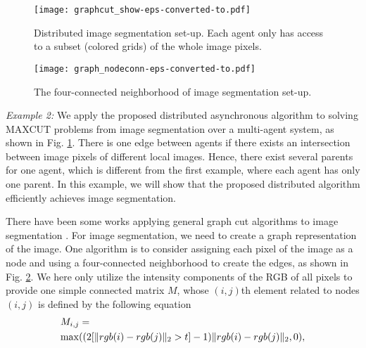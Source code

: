 \documentclass[journal]{IEEEtran}
\newtheorem{remark}{Remark}[section]
\begin{document}
\begin{figure}
	\centering
	\texttt{[image: graphcut\_show-eps-converted-to.pdf]}\\
	\caption{Distributed image segmentation set-up. Each agent only has access to a subset (colored grids) of the whole image pixels.}\label{image_cut_show}
	\centering
\end{figure}
\begin{figure}
	\centering
	\texttt{[image: graph\_nodeconn-eps-converted-to.pdf]}\\
	\caption{The four-connected neighborhood of image segmentation set-up.}\label{pixel_show}
	\centering
\end{figure}
\par \textit{Example 2:} We apply the proposed distributed asynchronous algorithm to solving MAXCUT problems from image segmentation over a multi-agent system, as shown in Fig. \ref{image_cut_show}. There is one edge between agents if there exists an intersection between image pixels of different local images. Hence, there exist several parents for one agent, which is different from the first example, where each agent has only one parent. In this example, we will show that the proposed distributed algorithm efficiently achieves image segmentation.
\par There have been some works applying general graph cut algorithms to image segmentation \cite{cut_survey,cut_2008,image_seg2013,graph_cut_06}. For image segmentation, we need to create a graph representation of the image. One algorithm is to consider assigning each pixel of the image as a node and using a four-connected neighborhood to create the edges\cite{image_seg2013}, as shown in Fig. \ref{pixel_show}. We here only utilize the intensity components of the RGB of all pixels to provide one simple connected matrix $M$, whose $(i,j)$th element related to nodes $(i,j)$ is defined by the following equation \cite{image_seg2013}
\begin{align*}
&M_{i,j}=\\
&{\rm max}((2[\|rgb(i)-rgb(j)\|_2>t]-1)\|rgb(i)-rgb(j)\|_2,0),
\end{align*}
\end{document}
